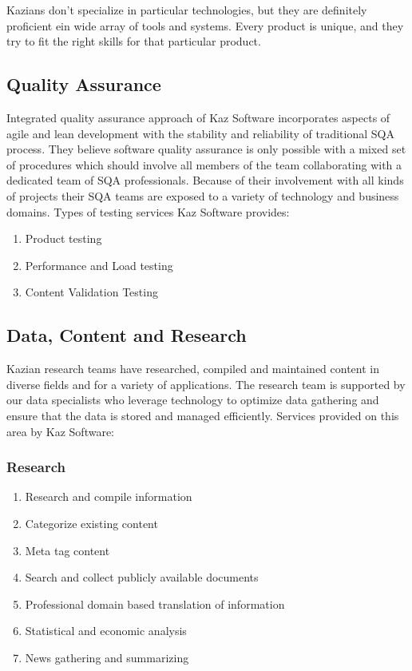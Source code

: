 Kazians don't specialize in particular technologies, but they are definitely proficient ein wide array of tools and systems.
Every product is unique, and they try to fit the right skills for that particular product.

\subsection{Quality Assurance}

Integrated quality assurance approach of Kaz Software incorporates aspects of agile and lean development with the stability and reliability of traditional SQA process.
They believe software quality assurance is only possible with a mixed set of procedures which should involve all members of the team collaborating with a dedicated team of SQA professionals.
Because of their involvement with all kinds of projects their SQA teams are exposed to a variety of technology and business domains.
Types of testing services Kaz Software provides:

\begin{enumerate}
    \item Product testing
    \item Performance and Load testing
    \item Content Validation Testing
\end{enumerate}

\subsection{Data, Content and Research}

Kazian research teams have researched, compiled and maintained content in diverse fields and for a variety of applications.
The research team is supported by our data specialists who leverage technology to optimize data gathering and ensure that the data is stored and managed efficiently.
Services provided on this area by Kaz Software:

\subsubsection*{Research}

\begin{enumerate}
    \item Research and compile information
    \item Categorize existing content
    \item Meta tag content
    \item Search and collect publicly available documents
    \item Professional domain based translation of information
    \item Statistical and economic analysis
    \item News gathering and summarizing
\end{enumerate}

